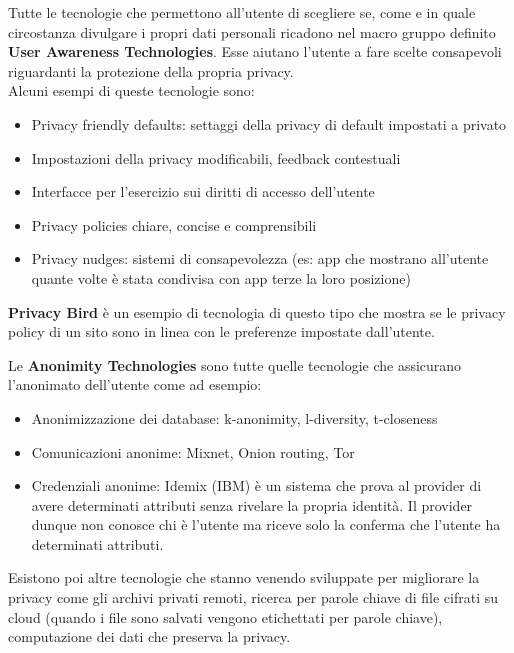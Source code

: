 Tutte le tecnologie che permettono all'utente di scegliere se, come e in quale circostanza divulgare i propri dati personali ricadono nel macro gruppo definito \textbf{User Awareness Technologies}.
Esse aiutano l'utente a fare scelte consapevoli riguardanti la protezione della propria privacy.\\
Alcuni esempi di queste tecnologie sono:
\begin{itemize}[noitemsep]
    \item Privacy friendly defaults: settaggi della privacy di default impostati a privato
    \item Impostazioni della privacy modificabili, feedback contestuali
    \item Interfacce per l'esercizio sui diritti di accesso dell'utente
    \item Privacy policies chiare, concise e comprensibili
    \item Privacy nudges: sistemi di consapevolezza (es: app che mostrano all'utente quante volte è stata condivisa con app terze la loro posizione)
\end{itemize}
\textbf{Privacy Bird} è un esempio di tecnologia di questo tipo che mostra se le privacy policy di un sito sono in linea con le preferenze impostate dall'utente.

Le \textbf{Anonimity Technologies} sono tutte quelle tecnologie che assicurano l'anonimato dell'utente come ad esempio:
\begin{itemize}[noitemsep]
    \item Anonimizzazione dei database: k-anonimity, l-diversity, t-closeness
    \item Comunicazioni anonime: Mixnet, Onion routing, Tor
    \item Credenziali anonime: Idemix (IBM) è un sistema che prova al provider di avere determinati attributi senza rivelare la propria identità. Il provider dunque non conosce chi è l'utente ma riceve solo la conferma che l'utente ha determinati attributi.
\end{itemize}

Esistono poi altre tecnologie che stanno venendo sviluppate per migliorare la privacy come gli archivi privati remoti, ricerca per parole chiave di file cifrati su cloud (quando i file sono salvati vengono etichettati per parole chiave), computazione dei dati che preserva la privacy.
